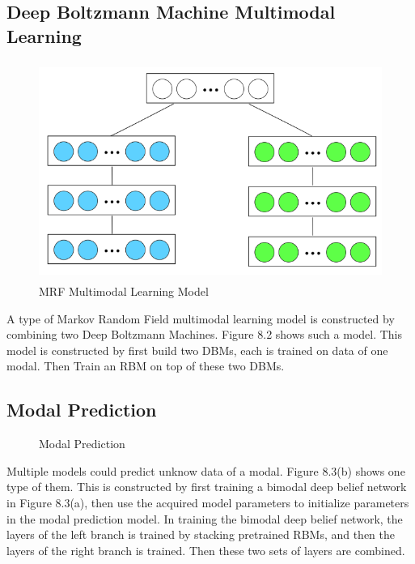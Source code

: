 \documentclass[12pt]{article}
\begin{document}
\subsection{Deep Boltzmann Machine Multimodal Learning}
\begin{figure}[h]
\centering
\includegraphics[height=2.8in]{DBMmodals.png}
\caption{MRF Multimodal Learning Model} \label{fig:side:a}
\end{figure}
A type of Markov Random Field multimodal learning model is constructed by combining two Deep Boltzmann Machines. Figure 8.2 shows such a model. This model is constructed by first build two DBMs, each is trained on data of one modal. Then Train an RBM on top of these two DBMs.
\subsection{Modal Prediction}
\begin{figure}[!t]
\centering
{}
\caption{Modal Prediction}
\label{fig5}
\end{figure}
Multiple models could predict unknow data of a modal. Figure 8.3(b) shows one type of them. This is constructed by first training a bimodal deep belief network in Figure 8.3(a), then use the acquired model parameters to initialize parameters in the modal prediction model. In training the bimodal deep belief network, the layers of the left branch is trained by stacking pretrained RBMs, and then the layers of the right branch is trained. Then these two sets of layers are combined.
\clearpage
\end{document}
